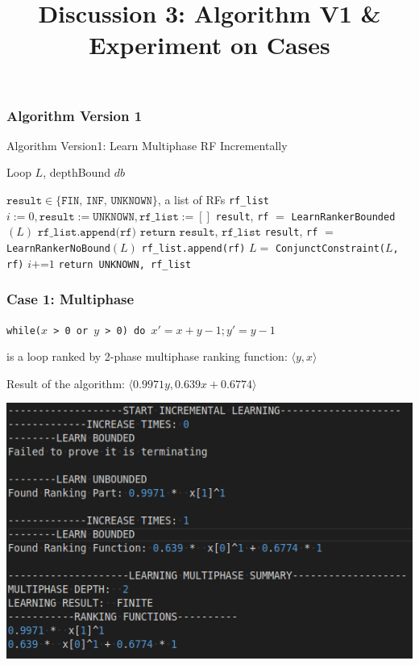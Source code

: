 \documentclass[10pt]{beamer}
\title{Discussion 3: Algorithm V1 \& Experiment on Cases}
\begin{document}
\maketitle
\begin{frame}\frametitle{Algorithm Version 1}
\begin{algorithm}[H]
\caption{Algorithm Version1: Learn Multiphase RF Incrementally}
\begin{algorithmic}[1]
\REQUIRE Loop $L$, depthBound $db$

\ENSURE $\texttt{result}\in \{\texttt{FIN, INF, UNKNOWN}\}$, a list of RFs \texttt{rf\_list}
\STATE $i := 0, \texttt{result} := \texttt{UNKNOWN},\texttt{rf\_list} := []$
\STATE \texttt{result}, \texttt{rf} $ = $ \texttt{LearnRankerBounded}$(L)$
\STATE $\texttt{rf\_list.append(rf)}$
\STATE $\texttt{return result, rf\_list}$
\ELSE 
\STATE \texttt{result}, \texttt{rf} $ = $ \texttt{LearnRankerNoBound}$(L)$
\STATE \texttt{rf\_list.append(rf)}
\ENDIF
\STATE $L = $ \texttt{ConjunctConstraint($L$, rf)}
\STATE $i \texttt{+=} 1$
\ENDWHILE
\STATE \texttt{return UNKNOWN, rf\_list}
\end{algorithmic}
\end{algorithm}
\end{frame}


\begin{frame}\frametitle{Case 1: Multiphase}
\begin{example}
\texttt{while($x$ > 0 or $y$ > 0) do }$x' = x + y - 1; y' = y - 1$

is a loop ranked by 2-phase multiphase ranking function: $\langle y, x\rangle$
\end{example}

Result of the algorithm: $\langle 0.9971 y, 0.639x + 0.6774\rangle$

\begin{center}
\includegraphics[scale=0.5]{1.png}
\end{center}

\end{frame}
\end{document}
